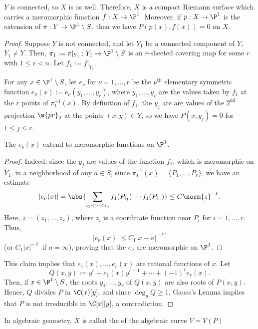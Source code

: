 \documentclass[11pt]{report}
\begin{document}
\begin{prop}
    $Y$ is connected, so $X$ is as well. Therefore, $X$ is a compact Riemann surface which carries a meromorphic function $f:X \to \P^1$. Moreover, if $p:X \to \P^1$ is the extension of $\pi:Y \to \P^1 \setminus S$, then we have $P(p(x),f(x))=0$ on $X$.
\end{prop}

\begin{proof}
    Suppose $Y$ is not connected, and let $Y_1$ be a connected component of $Y$, $Y_1 \neq Y$. Then, $\pi_1:= \pi|_{Y_1}:Y_1 \to \P^1 \setminus S$ is an $r$-sheeted covering map for some $r$ with $1 \leq r < n$. Let $f_1:=f|_{Y_1}$.

    For any $x \in \P^1 \setminus S$, let $e_\nu$ for $\nu=1,\dots,r$ be the $\nu^{\text{th}}$ elementary symmetric function $e_\nu(x):=e_\nu(y_1,\dots,y_r)$, where $y_1,\dots,y_r$ are the values taken by $f_1$ at the $r$ points of $\pi^{-1}_1(x)$. By definition of $f_1$, the $y_j$ are are values of the $2^{\text{nd}}$ projection $\w{pr}_2$ at the points $(x,y) \in Y$, so we have $P(x,y_j)=0$ for $1 \leq j \leq r$.

    \begin{claim}
        The $e_\nu(x)$ extend to meromorphic functions on $\P^1$.
    \end{claim}

    \begin{proof}
        Indeed, since the $y_j$ are values of the function $f_1$, which is meromorphic on $Y_1$, in a neighborhood of any $a \in S$, since $\pi_1^{-1}(x) = \{P_1,\dots,P_r\}$, we have an estimate
        $$|e_\nu(x)| = \abs{\sum_{i_1<\cdots < i_\nu} f_1(P_{i_1})\cdots f_1(P_{i_\nu})} \leq C \norm{z}^{-\ell}.$$
        Here, $z=(z_1,\dots,z_r)$, where $z_i$ is a coordinate function near $P_i$ for $i=1,\dots,r$. Thus,
        $$|e_\nu(x)| \leq C_1 |x-a|^{-\ell'}$$
        (or $C_1|x|^{-\ell}$ if $a = \infty$), proving that the $e_\nu$ are meromorphic on $\P^1$.
    \end{proof}
    This claim implies that $e_1(x),\dots,e_r(x)$ are rational functions of $x$. Let
    $$Q(x,y) := y^r-e_1(x)y^{r-1}+\cdots + (-1)^re_r(x).$$
    Then, if $x \in \P^1 \setminus S$, the roots $y_1,\dots,y_r$ of $Q(x,y)$ are also roots of $P(x,y)$. Hence, $Q$ divides $P$ in $\C(x)[y]$, and since $\deg_y Q\geq 1$, Gauss's Lemma implies that $P$ is not irreducible in $\C[x][y]$, a contradiction.
\end{proof}

\begin{defn}
    In algebraic geometry, $X$ is called the  of the algebraic curve $V=V(P)$
\end{defn}
\end{document}
